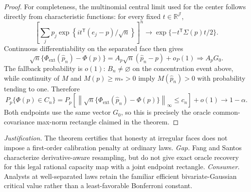 \documentclass{article}
\begin{document}
\begin{proof}
For completeness, the multinomial central limit used for the center follows directly from characteristic functions: for every fixed \(t\in\mathbb R^{\mathcal J}\),
\[
\left[\sum_jp_j\exp\!\left\{i t^{\mathsf T}(e_j-p)/\sqrt n\right\}\right]^n
\longrightarrow \exp\{-t^{\mathsf T}\Sigma(p)t/2\}.
\]
Continuous differentiability on the separated face then gives
\[
\sqrt n\{\Phi_{\mathrm{ext}}(\widehat p_n)-\Phi(p)\}
=A_p\sqrt n(\widehat p_n-p)+o_P(1)
\Rightarrow A_pG_0.
\]
The fallback probability is \(o(1)\): \(B_n\ne\varnothing\) on the concentration event above, while continuity of \(M\) and \(M(p)\ge m_*>0\) imply \(M(\widehat p_n)>0\) with probability tending to one.  Therefore
\[
P_p\{\Phi(p)\in C_n\}
=P_p\!\left[\left\|\sqrt n\{\Phi_{\mathrm{ext}}(\widehat p_n)-\Phi(p)\}\right\|_\infty\le c_n\right]+o(1)
\longrightarrow 1-\alpha.
\]
Both endpoints use the same vector \(G_0\), so this is precisely the oracle common-covariance max-norm rectangle claimed in the theorem.
\end{proof}
\par\smallskip\noindent \textit{Justification.} The theorem certifies that honesty at irregular faces does not impose a first-order calibration penalty at ordinary laws. \textit{Gap.} Fang and Santos characterize derivative-aware resampling, but do not give exact oracle recovery for this legal rational capacity map with a joint endpoint rectangle. \textit{Consumer.} Analysts at well-separated laws retain the familiar efficient bivariate-Gaussian critical value rather than a least-favorable Bonferroni constant.
\end{document}
